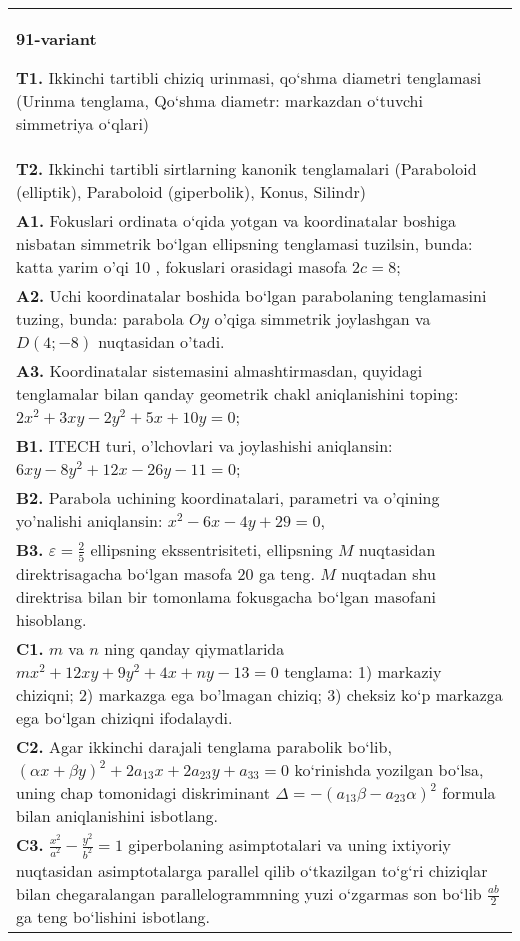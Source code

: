 \documentclass{article}
\begin{document}
\begin{tabular}{m{17cm}}
\textbf{91-variant}
\newline

\textbf{T1.} Ikkinchi tartibli chiziq urinmasi, qo‘shma diametri tenglamasi (Urinma tenglama, Qo‘shma diametr: markazdan o‘tuvchi simmetriya o‘qlari) \\
\textbf{T2.} Ikkinchi tartibli sirtlarning kanonik tenglamalari (Paraboloid (elliptik), Paraboloid (giperbolik), Konus, Silindr) \\
\textbf{A1.} Fokuslari ordinata o‘qida yotgan va koordinatalar boshiga nisbatan simmetrik bo‘lgan ellipsning tenglamasi tuzilsin, bunda: katta yarim o'qi 10 , fokuslari orasidagi masofa $2 c=8$; \\
\textbf{A2.} Uchi koordinatalar boshida bo‘lgan parabolaning tenglamasini tuzing, bunda: parabola $Oy$ o'qiga simmetrik joylashgan va $D(4 ;-8)$ nuqtasidan o’tadi. \\
\textbf{A3.} Koordinatalar sistemasini almashtirmasdan, quyidagi tenglamalar bilan qanday geometrik chakl aniqlanishini toping: $2 x^2+3 x y-2 y^2+5 x+10 y=0$; \\
\textbf{B1.} ITECH turi, o'lchovlari va joylashishi aniqlansin: $6 x y-8 y^2+12 x-26 y-11=0$; \\
\textbf{B2.} Parabola uchining koordinatalari, parametri va o'qining yo'nalishi aniqlansin: $x^2-6 x-4 y+29=0$, \\
\textbf{B3.} $\varepsilon=\frac{2}{5}$ ellipsning ekssentrisiteti, ellipsning $M$ nuqtasidan direktrisagacha bo‘lgan masofa 20 ga teng. $M$ nuqtadan shu direktrisa bilan bir tomonlama fokusgacha bo‘lgan masofani hisoblang. \\
\textbf{C1.} $m$ va $n$ ning qanday qiymatlarida $m x^2+12 x y+9 y^2+4 x+n y-13=0$ tenglama: 1) markaziy chiziqni; 2) markazga ega bo'lmagan chiziq; 3) cheksiz ko‘p markazga ega bo‘lgan chiziqni ifodalaydi. \\
\textbf{C2.} Agar ikkinchi darajali tenglama parabolik bo‘lib, $ (\alpha x+\beta y) ^2+2a_{13}x+2a_{23}y+a_{33}=0$ ko‘rinishda yozilgan bo‘lsa, uning chap tomonidagi diskriminant $\Delta=- (a_{13} \beta-a_{23} \alpha) ^2$ formula bilan aniqlanishini isbotlang. \\
\textbf{C3.} $\frac{x^2}{a^2}-\frac{y^2}{b^2}=1$ giperbolaning asimptotalari va uning ixtiyoriy nuqtasidan asimptotalarga parallel qilib o‘tkazilgan to‘g‘ri chiziqlar bilan chegaralangan parallelogrammning yuzi o‘zgarmas son bo‘lib $\frac{a b}{2}$ ga teng bo‘lishini isbotlang. \\

\end{tabular}
\vspace{1cm}
\end{document}
